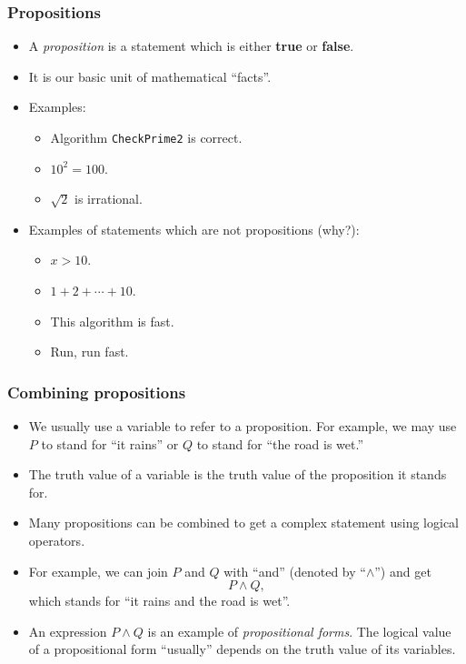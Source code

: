\documentclass{beamer}
\begin{document}
\begin{frame}\frametitle{Propositions}
  \begin{itemize}
  \item A {\em proposition} is a statement which is either {\bf true}
    or {\bf false}.
    \pause
  \item It is our basic unit of mathematical ``facts''.
    
  \item Examples:
    \begin{itemize}
    \item Algorithm {\tt CheckPrime2} is correct.
    \item $10^2 = 100$.
    \item $\sqrt{2}$ is irrational.
    \end{itemize}

    \pause
  \item Examples of statements which are not propositions (why?):
    \begin{itemize}
    \item $x > 10$.
    \item $1+2+\cdots+10$.
    \item This algorithm is fast.
    \item Run, run fast.
    \end{itemize}
  \end{itemize}
\end{frame}

\begin{frame}\frametitle{Combining propositions}
  \begin{itemize}
  \item We usually use a variable to refer to a proposition.  For
    example, we may use $P$ to stand for ``it rains'' or $Q$ to stand
    for ``the road is wet.''
    \pause
  \item The truth value of a variable is the truth value of the
    proposition it stands for.
    \pause
  \item Many propositions can be combined to get a complex statement
    using logical operators.  \pause
  \item For example, we can join $P$ and $Q$ with ``and'' (denoted by
    ``$\wedge$'') and get
    \[P\wedge Q,\]
    which stands for ``it rains and the road is wet''.
    \pause
    
  \item An expression $P\wedge Q$ is an example of {\em propositional
    forms}.  The logical value of a propositional form ``usually''
    depends on the truth value of its variables.
  \end{itemize}
\end{frame}
\end{document}
